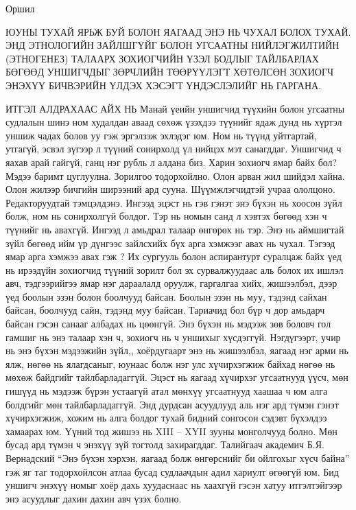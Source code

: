 Оршил

ЮУНЫ ТУХАЙ ЯРЬЖ БУЙ БОЛОН ЯАГААД ЭНЭ НЬ ЧУХАЛ БОЛОХ ТУХАЙ.
ЭНД ЭТНОЛОГИЙН ЗАЙЛШГҮЙГ БОЛОН УГСААТНЫ НИЙЛЭГЖИЛТИЙН (ЭТНОГЕНЕЗ) ТАЛААРХ ЗОХИОГЧИЙН ҮЗЭЛ БОДЛЫГ ТАЙЛБАРЛАХ БӨГӨӨД УНШИГЧДЫГ ЗӨРЧЛИЙН ТӨӨРҮҮЛЭГТ ХӨТӨЛСӨН ЗОХИОГЧ ЭНЭХҮҮ БИЧВЭРИЙН ҮЛДЭХ ХЭСЭГТ ҮНДЭСЛЭЛИЙГ НЬ ГАРГАНА.

ИТГЭЛ АЛДРАХААС АЙХ НЬ
Манай үеийн уншигчид түүхийн болон угсаатны судлалын шинэ ном худалдан аваад сөхөж үзэхдээ түүнийг ядаж дунд нь хүртэл уншиж чадах болов уу гэж эргэлзэж эхлэдэг юм. Ном нь түүнд уйтгартай, утгагүй, эсвэл зүгээр л түүний сонирхолд үл нийцэх мэт санагддаг. Уншигчид ч яахав арай гайгүй, ганц нэг рубль л алдана биз. Харин зохиогч ямар байх бол? Мэдээ баримт цуглуулна. Зорилгоо тодорхойлно. Олон арван жил шийдэл хайна. Олон жилээр бичгийн ширээний ард сууна. Шүүмжлэгчидтэй учраа ололцоно. Редакторуудтай тэмцэлдэнэ. Ингээд эцэст нь гэв гэнэт энэ бүхэн нь хоосон зүйл болж, ном нь сонирхолгүй болдог. Тэр нь номын санд л хэвтэх бөгөөд хэн ч түүнийг нь авахгүй. Ингээд л амьдрал талаар өнгөрөх нь тэр.
Энэ нь аймшигтай зүйл бөгөөд ийм үр дүнгээс зайлсхийх бүх арга хэмжээг авах нь чухал. Тэгээд ямар арга хэмжээ авах гэж ? Их сургууль болон аспирантурт суралцаж байх үед нь ирээдүйн зохиогчид түүний зорилт бол эх сурвалжуудаас аль болох их ишлэл авч, тэдгээрийгээ ямар нэг дараалалд оруулж, гаргалгаа хийх, жишээлбэл, дээр үед боолын эзэн болон боолчууд байсан. Боолын эзэн нь муу, тэдэнд сайхан байсан, боолчууд сайн, тэдэнд муу байсан. Тариачид бол бүр ч дор амьдарч байсан гэсэн санааг албадах нь цөөнгүй.
Энэ бүхэн нь мэдээж зөв боловч гол гамшиг нь энэ талаар хэн ч, зохиогч нь ч уншихыг хүсдэггүй. Нэгдүгээрт, учир нь энэ бүхэн мэдээжийн зүйл,, хоёрдугаарт энэ нь жишээлбэл, яагаад нэг арми нь ялж, нөгөө нь ялагдсаныг, юунаас болж нэг улс хүчирхэгжиж байхад нөгөө нь мөхөж байдгийг тайлбарладаггүй. Эцэст нь яагаад хүчирхэг угсаатнууд үүсч, мөн гишүүд нь мэдээж бүрэн устаагүй атал мөнхүү угсаатнууд хаашаа ч юм алга болдгийг мөн тайлбарладаггүй.
Энд дурдсан асуудлууд аль нэг ард түмэн гэнэт хүчирхэгжиж, хожим нь алга болдог тухай бидний сонгосон сэдэвт бүхэлдээ хамаарах юм. Үүний тод жишээ нь XIII – XYII зууны монголчууд болно. Мөн бусад ард түмэн ч энэхүү зүй тогтолд захирагддаг. Талийгаач академич Б.Я. Вернадский “Энэ бүхэн хэрхэн, яагаад болж өнгөрснийг би ойлгохыг хүсч байна” гэж яг таг тодорхойлсон атлаа бусад судлаачдын адил хариулт өгөөгүй юм. Бид уншигч энэхүү номыг хоёр дахь хуудаснаас нь хаахгүй гэсэн хатуу итгэлтэйгээр энэ асуудлыг дахин дахин авч үзэх болно.
